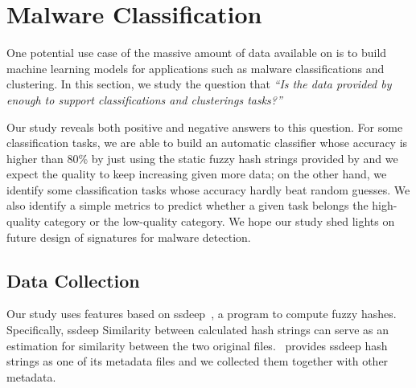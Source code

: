 \section{Malware Classification}
\label{sec:ssdeep}

One potential use case of the massive amount of data 
available on \vt{} is to build 
machine learning models for applications
such as malware classifications and
clustering. In this section, we study
the question that {\em ``Is the data
provided by \vt{} enough to support
classifications and clusterings tasks?''}

Our study reveals both positive and
negative answers to this question.
For some classification tasks, we are able
to build an automatic classifier whose
accuracy is higher than 80\% by just
using the static fuzzy hash strings provided by \vt{}
and we expect the quality to keep increasing
given more data; on the other hand,
we identify some classification tasks
whose accuracy hardly beat random guesses.
We also identify a simple metrics
to predict whether a given task belongs
the high-quality category or the low-quality
category. We hope our study shed lights
on future design of signatures for malware
detection.



\subsection{Data Collection}



Our study uses features based on ssdeep~\cite{ssdeep}, a program to compute fuzzy hashes. 
Specifically, ssdeep 
Similarity between calculated hash strings can serve as an estimation for similarity between the two original files. 
\vt\ provides ssdeep hash strings as one of its metadata files and we collected them together with other metadata.

